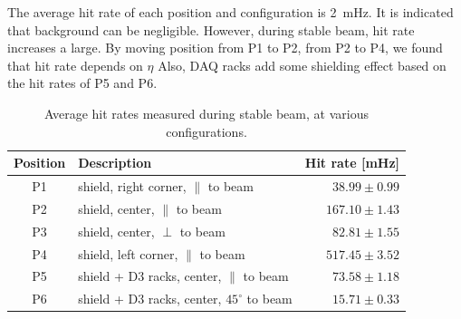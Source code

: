 The average hit rate of each position and configuration is 2~mHz. 
It is indicated that background can be negligible. 
However, during stable beam, hit rate increases a large.
By moving position from P1 to P2, from P2 to P4, we found that hit rate depends on $\eta$
Also, DAQ racks add some shielding effect based on the hit rates of P5 and P6.

\begin{table}
\begin{center}
\begin{tabular}{c|l|r}
  Position & \hspace{0.9cm}Description & Hit rate [mHz] \\
  \hline \hline
   P1 & shield, right corner, $\parallel$ to beam & $ 38.99 \pm 0.99 $\\ \hline
   P2 & shield, center, $\parallel$ to beam& $ 167.10 \pm 1.43$ \\ \hline
   P3 & shield, center, $\perp$ to beam& $ 82.81 \pm 1.55 $ \\ \hline
   P4 & shield, left corner, $\parallel$ to beam& $ 517.45 \pm 3.52 $ \\ \hline
   P5 & shield + D3 racks, center, $\parallel$ to beam& $ 73.58 \pm 1.18 $ \\ \hline
   P6 & shield + D3 racks, center, $45^\circ$ to beam& $ 15.71 \pm 0.33 $ \\ \hline
\end{tabular}
\caption{\label{table:rate_stable_beam}
    Average hit rates measured during stable beam, at various configurations.
}
\end{center}
\end{table}

